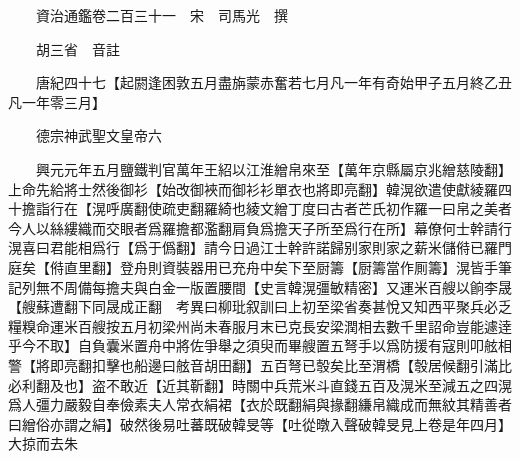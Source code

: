 










 


 
 


 

  
  
  
  
  





  
  
  
  
  
 
  

  

  
  
  



  

 
 

  
   




  

  
  


  　　資治通鑑卷二百三十一　宋　司馬光　撰

　　胡三省　音註

　　唐紀四十七【起閼逢困敦五月盡旃蒙赤奮若七月凡一年有奇始甲子五月終乙丑凡一年零三月】

　　德宗神武聖文皇帝六

　　興元元年五月鹽鐵判官萬年王紹以江淮繒帛來至【萬年京縣屬京兆繒慈陵翻】上命先給將士然後御衫【始改御裌而御衫衫單衣也將即亮翻】韓滉欲遣使獻綾羅四十擔詣行在【滉呼廣翻使疏吏翻羅綺也綾文繒丁度曰古者芒氏初作羅一曰帛之美者今人以絲縷織而交眼者爲羅擔都濫翻肩負爲擔天子所至爲行在所】幕僚何士幹請行滉喜曰君能相爲行【爲于僞翻】請今日過江士幹許諾歸别家則家之薪米儲偫已羅門庭矣【偫直里翻】登舟則資裝器用已充舟中矣下至厨籌【厨籌當作厠籌】滉皆手筆記列無不周備每擔夫與白金一版置腰間【史言韓滉彊敏精密】又運米百艘以餉李晟【艘蘇遭翻下同晟成正翻　考異曰柳玭叙訓曰上初至梁省奏甚悅又知西平聚兵必乏糧糗命運米百艘按五月初梁州尚未春服月末已克長安梁潤相去數千里詔命豈能遽逹乎今不取】自負囊米置舟中將佐爭舉之須臾而畢艘置五弩手以爲防援有寇則叩舷相警【將即亮翻扣擊也船邊曰舷音胡田翻】五百弩已彀矣比至渭橋【彀居候翻引滿比必利翻及也】盗不敢近【近其靳翻】時關中兵荒米斗直錢五百及滉米至減五之四滉爲人彊力嚴毅自奉儉素夫人常衣絹裙【衣於既翻絹與掾翻縑帛織成而無紋其精善者曰繒俗亦謂之絹】破然後易吐蕃既破韓旻等【吐從暾入聲破韓旻見上卷是年四月】大掠而去朱

